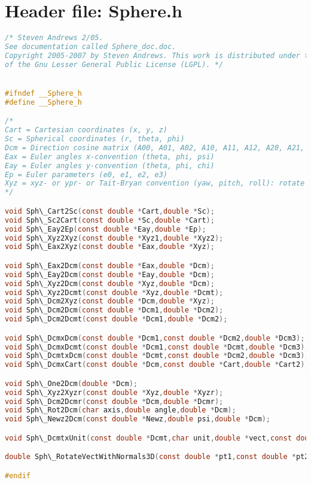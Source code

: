 \documentclass[11pt]{article}
\begin{document}
\maketitle

\section{Header file: Sphere.h}

\begin{lstlisting}[language=C]
/* Steven Andrews 2/05.
See documentation called Sphere_doc.doc.
Copyright 2005-2007 by Steven Andrews. This work is distributed under the terms
of the Gnu Lesser General Public License (LGPL). */


#ifndef __Sphere_h
#define __Sphere_h

/*
Cart = Cartesian coordinates (x, y, z)
Sc = Spherical coordinates (r, theta, phi)
Dcm = Direction cosine matrix (A00, A01, A02, A10, A11, A12, A20, A21, A22)
Eax = Euler angles x-convention (theta, phi, psi)
Eay = Euler angles y-convention (theta, phi, chi)
Ep = Euler parameters (e0, e1, e2, e3)
Xyz = xyz- or ypr- or Tait-Bryan convention (yaw, pitch, roll): rotate on z, then y, then x
*/

void Sph\_Cart2Sc(const double *Cart,double *Sc);
void Sph\_Sc2Cart(const double *Sc,double *Cart);
void Sph\_Eay2Ep(const double *Eay,double *Ep);
void Sph\_Xyz2Xyz(const double *Xyz1,double *Xyz2);
void Sph\_Eax2Xyz(const double *Eax,double *Xyz);

void Sph\_Eax2Dcm(const double *Eax,double *Dcm);
void Sph\_Eay2Dcm(const double *Eay,double *Dcm);
void Sph\_Xyz2Dcm(const double *Xyz,double *Dcm);
void Sph\_Xyz2Dcmt(const double *Xyz,double *Dcmt);
void Sph\_Dcm2Xyz(const double *Dcm,double *Xyz);
void Sph\_Dcm2Dcm(const double *Dcm1,double *Dcm2);
void Sph\_Dcm2Dcmt(const double *Dcm1,double *Dcm2);

void Sph\_DcmxDcm(const double *Dcm1,const double *Dcm2,double *Dcm3);
void Sph\_DcmxDcmt(const double *Dcm1,const double *Dcmt,double *Dcm3);
void Sph\_DcmtxDcm(const double *Dcmt,const double *Dcm2,double *Dcm3);
void Sph\_DcmxCart(const double *Dcm,const double *Cart,double *Cart2);

void Sph\_One2Dcm(double *Dcm);
void Sph\_Xyz2Xyzr(const double *Xyz,double *Xyzr);
void Sph\_Dcm2Dcmr(const double *Dcm,double *Dcmr);
void Sph\_Rot2Dcm(char axis,double angle,double *Dcm);
void Sph\_Newz2Dcm(const double *Newz,double psi,double *Dcm);

void Sph\_DcmtxUnit(const double *Dcmt,char unit,double *vect,const double *add,double mult);

double Sph\_RotateVectWithNormals3D(const double *pt1,const double *pt2,double *newpt2,double *oldnorm,double *newnorm,int sign);

#endif
\end{lstlisting}
\end{document}
